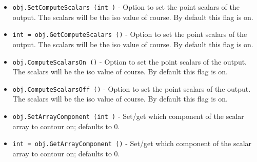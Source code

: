 \begin{itemize}
\item  \verb|obj.SetComputeScalars (int )| -  Option to set the point scalars of the output.  The scalars will be the 
 iso value of course.  By default this flag is on.

\item  \verb|int = obj.GetComputeScalars ()| -  Option to set the point scalars of the output.  The scalars will be the 
 iso value of course.  By default this flag is on.

\item  \verb|obj.ComputeScalarsOn ()| -  Option to set the point scalars of the output.  The scalars will be the 
 iso value of course.  By default this flag is on.

\item  \verb|obj.ComputeScalarsOff ()| -  Option to set the point scalars of the output.  The scalars will be the 
 iso value of course.  By default this flag is on.

\item  \verb|obj.SetArrayComponent (int )| -  Set/get which component of the scalar array to contour on; defaults to 0.

\item  \verb|int = obj.GetArrayComponent ()| -  Set/get which component of the scalar array to contour on; defaults to 0.

\end{itemize}
